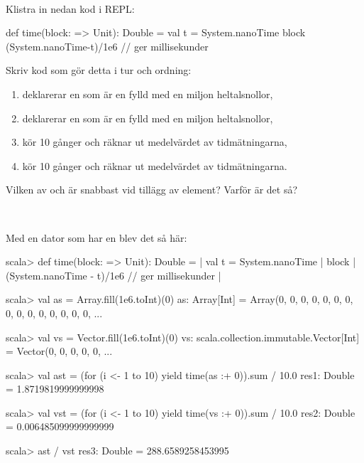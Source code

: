 
\QUESTBEGIN

\Task \what~\\
Klistra in nedan kod i REPL:
\begin{Code}
def time(block: => Unit): Double = {
  val t = System.nanoTime
  block
  (System.nanoTime-t)/1e6  // ger millisekunder
}
\end{Code}

\Subtask Skriv kod som gör detta i tur och ordning:
\begin{enumerate}
  \item deklarerar en  som är en  fylld med en miljon heltalsnollor,
  \item deklarerar en  som är en  fylld med en miljon heltalsnollor,
  \item kör  10 gånger och räknar ut medelvärdet av tidmätningarna,
  \item kör  10 gånger och räknar ut medelvärdet av tidmätningarna.
\end{enumerate}

\Subtask Vilken av  och  är snabbast vid tillägg av element? Varför är det så?

\SOLUTION

\TaskSolved \what~

\SubtaskSolved Med en dator som har en  blev det så här:
\begin{REPL}
scala> def time(block: => Unit): Double = {
     |   val t = System.nanoTime
     |   block
     |   (System.nanoTime - t)/1e6  // ger millisekunder
     | }

scala> val as = Array.fill(1e6.toInt)(0)
as: Array[Int] = Array(0, 0, 0, 0, 0, 0, 0, 0, 0, 0, 0, 0, 0, 0, 0, ...

scala> val vs = Vector.fill(1e6.toInt)(0)
vs: scala.collection.immutable.Vector[Int] = Vector(0, 0, 0, 0, 0, ...

scala> val ast = (for (i <- 1 to 10) yield time(as :+ 0)).sum / 10.0
res1: Double = 1.8719819999999998

scala> val vst = (for (i <- 1 to 10) yield time(vs :+ 0)).sum / 10.0
res2: Double = 0.006485099999999999

scala> ast / vst
res3: Double = 288.6589258453995

\end{REPL}

